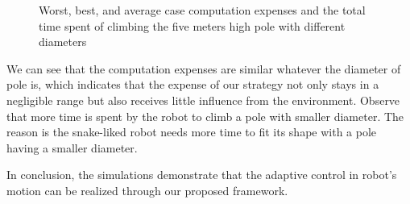 \begin{figure}[!h]
	\centering
	\caption{Worst, best, and average case computation expenses and the total time spent of climbing the five meters high pole with different diameters}
\end{figure}

We can see that the computation expenses are similar whatever the diameter of pole is, which indicates that the expense of our strategy not only stays in a negligible range but also receives little influence from the environment. Observe that more time is spent by the robot to climb a pole with smaller diameter. The reason is the snake-liked robot needs more time to fit its shape with a pole having a smaller diameter.

In conclusion, the simulations demonstrate that the adaptive control in robot's motion can be realized through our proposed framework.

